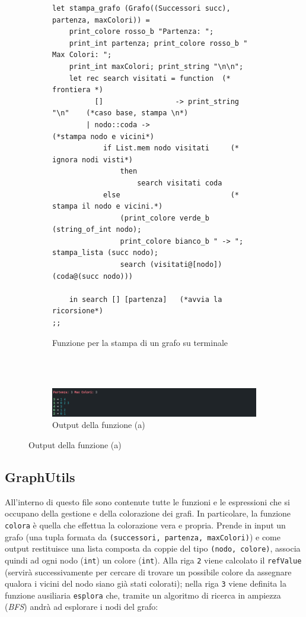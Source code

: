 \begin{figure}[H]
\begin{subfigure}{\textwidth}
\begin{lstlisting}[style=caml]
let stampa_grafo (Grafo((Successori succ), partenza, maxColori)) =
	print_colore rosso_b "Partenza: ";
	print_int partenza; print_colore rosso_b " Max Colori: ";
	print_int maxColori; print_string "\n\n";
	let rec search visitati = function  (* frontiera *)
		  [] 				 -> print_string "\n"    (*caso base, stampa \n*)      
		| nodo::coda ->                      (*stampa nodo e vicini*)
			if List.mem nodo visitati     (* ignora nodi visti*)
				then 
					search visitati coda
			else                          (* stampa il nodo e vicini.*)
				(print_colore verde_b (string_of_int nodo); 
				print_colore bianco_b " -> "; stampa_lista (succ nodo); 
				search (visitati@[nodo]) (coda@(succ nodo)))

	in search [] [partenza]   (*avvia la ricorsione*)
;;
\end{lstlisting}
\caption{Funzione per la stampa di un grafo su terminale}
\end{subfigure}
\ \\
\ \\
\begin{subfigure}{\textwidth}
	\centering
	\includegraphics[width=\textwidth]{img/grafoTerminale.png}
	\caption{Output della funzione (a)}
\end{subfigure}
\end{figure}

\subsection{GraphUtils}

All'interno di questo file sono contenute tutte le funzioni e le espressioni che si occupano della gestione e  della colorazione dei grafi. In particolare, la funzione \lstinline[style=cmd]|colora| è quella che effettua la colorazione vera e propria. Prende in input un grafo (una tupla formata da \lstinline[style=cmd]|(successori, partenza, maxColori)|) e come output restituisce una lista composta da coppie del tipo \lstinline[style=cmd]|(nodo, colore)|, associa quindi ad ogni nodo (\lstinline[style=cmd]|int|) un colore (\lstinline[style=cmd]|int|). Alla riga \lstinline[style=cmd]|2| viene calcolato il \lstinline[style=cmd]|refValue| (servirà successivamente per cercare di trovare un possibile colore da assegnare qualora i vicini del nodo siano già stati colorati); nella riga \lstinline[style=cmd]|3| viene definita la funzione ausiliaria \lstinline[style=cmd]|esplora| che, tramite un algoritmo di ricerca in ampiezza (\textit{BFS}) andrà ad esplorare i nodi del grafo:

